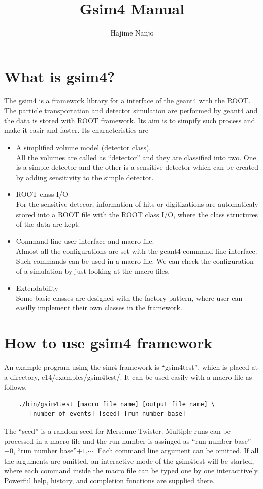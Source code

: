 \documentclass[a4paper,12pt]{article}
\begin{document}
\title{Gsim4 Manual}
\author{Hajime Nanjo}
\maketitle
 \section{What is gsim4?}
 The gsim4 is a framework library for a interface of the geant4 with the
 ROOT. The particle transportation and detector simulation are performed
 by geant4 and the data is stored with ROOT framework.
 Its aim is to simpify such process and make it easir and
 faster. Its characteristics are 
 \begin{itemize}
  \item A simplified volume model (detector class).\\
	All the volumes are called as ``detector'' and they are
	classified into two. One is a simple detector and the other is
	a sensitive detector which can be created by adding sensitivity
 	to the simple detector.
  \item ROOT class I/O\\
	For the sensitive  detecor, information
	of hits or digitizations are automaticaly stored into a ROOT
	file with the ROOT class I/O, where the class structures of the
	data are kept.
  \item Command line user interface and macro file.\\
	Almost all the configurations are set with
	the geant4 command line interface. Such commands can be used in
	a macro file. We can check the configuration of a simulation by
	just looking at the macro files.
  \item Extendability\\
	Some basic classes are designed with the factory pattern, where
	user can easilly implement their own classes in the framework. 
 \end{itemize}
 \section{How to use gsim4 framework}
 An example program using the sim4 framework is ``gsim4test'',
 which is placed at a directory, e14/examples/gsim4test/.
 It can be used easily with a macro file as follows.
 \begin{screen}
   \begin{verbatim}
	./bin/gsim4test [macro file name] [output file name] \
	   [number of events] [seed] [run number base]\end{verbatim}  
 \end{screen}
 The ``seed'' is a random seed for Mersenne Twister. Multiple runs can
 be processed in a macro file and the run number is
 assinged as ``run number base''$+0$, ``run number base''$+1$,$\cdots$.
 Each command line argument can be omitted. If all the arguments are
 omitted, an interactive mode of the gsim4test will be started, where
 each command inside the macro file can be typed one by one
 interacttively. Powerful help, history, and completion functions are
 supplied there.
\end{document}
